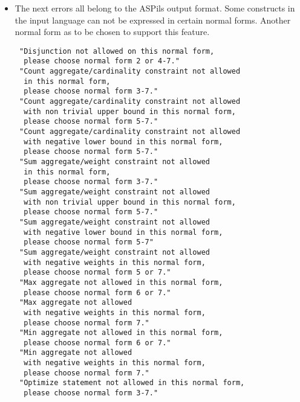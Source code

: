 \documentclass[a4paper,10pt]{article}
\begin{document}
\begin{itemize}
\item
The next errors all belong to the ASPils output format.
Some constructs in the input language can not be expressed in certain normal forms.
Another normal form as to be chosen to support this feature.
\begin{verbatim}
 "Disjunction not allowed on this normal form,
  please choose normal form 2 or 4-7."
 "Count aggregate/cardinality constraint not allowed
  in this normal form,
  please choose normal form 3-7."
 "Count aggregate/cardinality constraint not allowed 
  with non trivial upper bound in this normal form,
  please choose normal form 5-7."
 "Count aggregate/cardinality constraint not allowed 
  with negative lower bound in this normal form,
  please choose normal form 5-7."
 "Sum aggregate/weight constraint not allowed
  in this normal form,
  please choose normal form 3-7."
 "Sum aggregate/weight constraint not allowed 
  with non trivial upper bound in this normal form,
  please choose normal form 5-7."
 "Sum aggregate/weight constraint not allowed 
  with negative lower bound in this normal form,
  please choose normal form 5-7"
 "Sum aggregate/weight constraint not allowed
  with negative weights in this normal form,
  please choose normal form 5 or 7."
 "Max aggregate not allowed in this normal form,
  please choose normal form 6 or 7."
 "Max aggregate not allowed
  with negative weights in this normal form,
  please choose normal form 7."
 "Min aggregate not allowed in this normal form,
  please choose normal form 6 or 7."
 "Min aggregate not allowed 
  with negative weights in this normal form,
  please choose normal form 7."
 "Optimize statement not allowed in this normal form,
  please choose normal form 3-7."
\end{verbatim}
\end{itemize}
\end{document}
